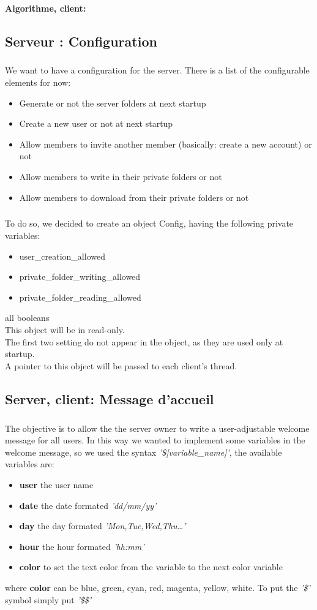 \documentclass[12pt,a4paper,twoside]{article}
\begin{document}
			\paragraph*{Algorithme, client:}
				
		\subsection{Serveur : Configuration} %
			\subparagraph*{}
				We want to have a configuration for the server. There is a list of the configurable elements for now:
				\begin{itemize}
					\item{} Generate or not the server folders at next startup
					\item{} Create a new user or not at next startup
					\item{} Allow members to invite another member (basically: create a new account) or not
					\item{} Allow members to write in their private folders or not
					\item{} Allow members to download from their private folders or not
				\end{itemize}
			\subparagraph*{}
				To do so, we decided to create an object Config, having the following private variables:
				\begin{itemize}
					\item{} user\_creation\_allowed
					\item{} private\_folder\_writing\_allowed
					\item{} private\_folder\_reading\_allowed
				\end{itemize}
				all booleans\\
				This object will be in read-only.\\
				The first two setting do not appear in the object, as they are used only at startup.\\
				A pointer to this object will be passed to each client's thread.
		\subsection{Server, client: Message d'accueil} %
			\subparagraph*{}
				The objective is to allow the the server owner to write a user-adjustable welcome message for all users.
				In this way we wanted to implement some variables in the welcome message, so we used the syntax \textit{'\$[variable\_name]'}, the available variables are:
				\begin{itemize}
					\item{} \textbf{user} the user name
					\item{} \textbf{date} the date formated \textit{'dd/mm/yy'}
					\item{} \textbf{day} the day formated \textit{'Mon,Tue,Wed,Thu\ldots'}
					\item{} \textbf{hour} the hour formated \textit{'hh:mm'}
					\item{} \textbf{color} to set the text color from the variable to the next color variable
				\end{itemize}
				where \textbf{color} can be blue, green, cyan, red, magenta, yellow, white.
				To put the \textit{'\$'} symbol simply put \textit{'\$\$'}
\end{document}
